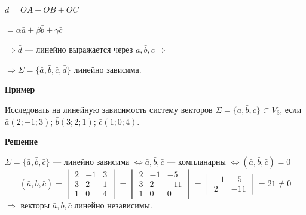 \documentclass[12pt,a4paper]{article}
\newcommand{\va}{\bar a}
\newcommand{\vb}{\bar b}
\newcommand{\vc}{\bar c}
\newcommand{\vd}{\bar d}
\begin{document}
\begin{minipage}{0.5\textwidth}
$\vd = \overline{OA} + \overline{OB} + \overline{OC} =$

$= \alpha \va + \beta \vb + \gamma \vc$

$\Rightarrow \vd$ --- линейно выражается через $\va, \vb, \vc \Rightarrow$

$\Rightarrow \Sigma = \{\va, \vb, \vc, \vd\}$ линейно зависима.
\end{minipage}

\textbf{Пример}

Исследовать на линейную зависимость систему векторов $\Sigma = \{\va,
\vb, \vc\} \subset V_3$, если $\va(2; -1; 3)$; $\vb(3; 2; 1)$; $\vc(1; 0; 4)$.

\textbf{Решение}

$\Sigma = \{\va, \vb, \vc\}$ --- линейно зависима $\Leftrightarrow
\va, \vb, \vc$ --- компланарны $\Leftrightarrow (\va, \vb, \vc) = 0$
$$
(\va, \vb, \vc) =
\begin{vmatrix} 2 & -1 & 3 \\ 3 & 2 & 1 \\ 1 & 0 & 4
\end{vmatrix} =
\begin{vmatrix} 2 & -1 & -5 \\ 3 & 2 & -11 \\ 1 & 0 & 0
\end{vmatrix} =
\begin{vmatrix} -1 & -5 \\ 2 & -11
\end{vmatrix} = 21 \ne 0
$$
$\Longrightarrow$ векторы $\va, \vb, \vc$ линейно независимы.
\end{document}
